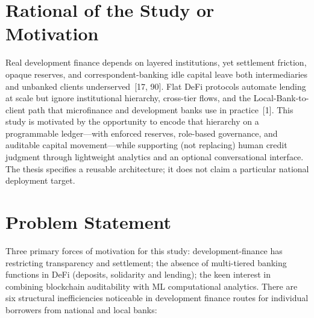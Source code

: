 \section{Rational of the Study or Motivation}
\label{sec:rationale}

Real development finance depends on layered institutions, yet settlement friction, opaque reserves, and correspondent-banking idle capital leave both intermediaries and unbanked clients underserved~[17, 90]. Flat DeFi protocols automate lending at scale but ignore institutional hierarchy, cross-tier flows, and the Local-Bank-to-client path that microfinance and development banks use in practice~[1]. This study is motivated by the opportunity to encode that hierarchy on a programmable ledger---with enforced reserves, role-based governance, and auditable capital movement---while supporting (not replacing) human credit judgment through lightweight analytics and an optional conversational interface. The thesis specifies a reusable architecture; it does not claim a particular national deployment target.

\section{Problem Statement}

Three primary forces of motivation for this study: development-finance has restricting transparency and settlement; the absence of multi-tiered banking functions in DeFi (deposits, solidarity and lending); the keen interest in combining blockchain auditability with ML computational analytics. There are six structural inefficiencies noticeable in development finance routes for individual borrowers from national and local banks:

